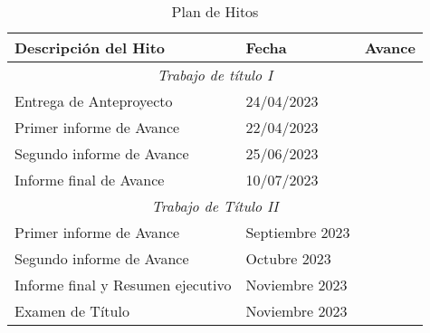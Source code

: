 \begin{table}[H]
\centering
\begin{tabular}{@{}lll@{}}
\toprule
\textbf{Descripción del Hito}     & \textbf{Fecha}  & \textbf{Avance} \\ \midrule
\multicolumn{3}{c}{\textit{Trabajo de título I}}                      \\ \midrule
Entrega de Anteproyecto           & 24/04/2023      &                 \\
Primer informe de Avance          & 22/04/2023      &                 \\
Segundo informe de Avance         & 25/06/2023      &                 \\
Informe final de Avance           & 10/07/2023      &                 \\ \midrule
\multicolumn{3}{c}{\textit{Trabajo de Título II}}                     \\ \midrule
Primer informe de Avance          & Septiembre 2023 &                 \\
Segundo informe de Avance         & Octubre 2023    &                 \\
Informe final y Resumen ejecutivo & Noviembre 2023  &                 \\
Examen de Título                  & Noviembre 2023  &                 \\ \bottomrule
\end{tabular}
\caption{Plan de Hitos}
\label{tab:hitos}
\end{table}

